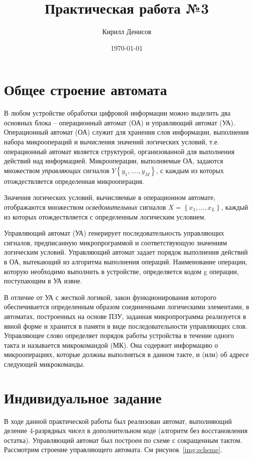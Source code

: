 \documentclass[a4paper,14pt]{extarticle}
\author{Кирилл Денисов}
\title{Практическая работа №3}
\date{\today}
\newcommand{\pathToCommonFolder}{/home/denilai/Desktop/LaTeX/Common}
\begin{document}
	\thispagestyle{empty}
	
	
	
	\newpage
	\tableofcontents
	\newpage
	
\section{Общее строение автомата}
В любом устройстве обработки цифровой информации можно выделить два основных блока – операционный автомат (ОА) и управляющий автомат (УА). Операционный автомат (ОА) служит для хранения слов информации, выполнения набора микроопераций и вычисления значений логических условий, т.е. операционный автомат является структурой, организованной для выполнения действий над информацией. Микрооперации, выполняемые ОА, задаются множеством \textit{управляющих} сигналов $Y\left\{y_1,....,y_M\right\}$, с каждым из которых отождествляется определенная микрооперация.

Значения логических условий, вычисляемые в операционном автомате, отображаются множеством \textit{осведомительных} сигналов $X=\left\{x_1,...,x_L\right\}$, каждый из которых отождествляется с определенным логическим условием.

Управляющий автомат (УА) генерирует последовательность управляющих сигналов, предписанную микропрограммой и соответствующую значениям логическим условий. Управляющий автомат задает порядок выполнения действий в ОА, вытекающий из алгоритма выполнения операций. Наименование операции, которую необходимо выполнить в устройстве, определяется кодом g операции, поступающим в УА извне. 

В отличие от УА с жесткой логикой, закон функционирования которого обеспечивается определенным образом соединенными логическими элементами, в автоматах, построенных на основе ПЗУ, заданная микропрограмма реализуется в явной форме и хранится в памяти в виде последовательности управляющих слов. Управляющее слово определяет порядок работы устройства в течение одного такта и называется микрокомандой (МК). Она содержит информацию о микрооперациях, которые должны выполняться в данном такте, и (или) об адресе следующей микрокоманды.
\section{Индивидуальное задание}
В ходе данной практической работы был реализован автомат, выполняющий деление 4-разрядных чисел в дополнительном коде (алгоритм без восстановления остатка). Управляющий автомат был построен по схеме с сокращенным тактом. Рассмотрим строение управляющего автомата. См рисунок~\ref{img:scheme}.
\end{document}
